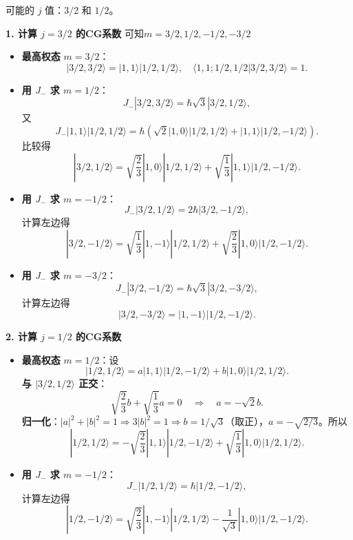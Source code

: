 可能的 \(j\) 值：\(3/2\) 和 \(1/2\)。

\noindent\textbf{1. 计算 \(j = 3/2\) 的CG系数} 可知\(m=3/2,1/2,-1/2,-3/2\)
\begin{itemize}
	\item \textbf{最高权态} \(m = 3/2\)：
	\[
	|3/2, 3/2\rangle = |1, 1\rangle |1/2, 1/2\rangle, \quad \langle 1,1; 1/2,1/2 | 3/2,3/2\rangle = 1.
	\]
	
	\item \textbf{用 \(J_-\) 求 \(m = 1/2\)}：
	\[
	J_- |3/2,3/2\rangle = \hbar\sqrt{3} |3/2,1/2\rangle,
	\]
	又
	\[
	J_- |1,1\rangle |1/2,1/2\rangle = \hbar\left( \sqrt{2} |1,0\rangle |1/2,1/2\rangle + |1,1\rangle |1/2,-1/2\rangle \right).
	\]
	比较得
	\[
	|3/2,1/2\rangle = \sqrt{\frac{2}{3}} |1,0\rangle |1/2,1/2\rangle + \sqrt{\frac{1}{3}} |1,1\rangle |1/2,-1/2\rangle.
	\]
	\item \textbf{用 \(J_-\) 求 \(m = -1/2\)}：
	\[
	J_- |3/2,1/2\rangle = 2\hbar |3/2,-1/2\rangle,
	\]
	计算左边得
	\[
	|3/2,-1/2\rangle = \sqrt{\frac{1}{3}} |1,-1\rangle |1/2,1/2\rangle + \sqrt{\frac{2}{3}} |1,0\rangle |1/2,-1/2\rangle.
	\]
	\item \textbf{用 \(J_-\) 求 \(m = -3/2\)}：
	\[
	J_- |3/2,-1/2\rangle = \hbar\sqrt{3} |3/2,-3/2\rangle,
	\]
	计算左边得
	\[
	|3/2,-3/2\rangle = |1,-1\rangle |1/2,-1/2\rangle.
	\]
\end{itemize}

\vspace{0.5em}
\noindent\textbf{2. 计算 \(j = 1/2\) 的CG系数}
\begin{itemize}
	\item \textbf{最高权态} \(m = 1/2\)：设
	\[
	|1/2,1/2\rangle = a |1,1\rangle |1/2,-1/2\rangle + b |1,0\rangle |1/2,1/2\rangle.
	\]
	\textbf{与 \(|3/2,1/2\rangle\) 正交}：
	\[
	\sqrt{\frac{2}{3}} b + \sqrt{\frac{1}{3}} a = 0 \quad \Rightarrow \quad a = -\sqrt{2} b.
	\]
	\textbf{归一化}：\(|a|^2 + |b|^2 = 1 \Rightarrow 3|b|^2 = 1 \Rightarrow b = 1/\sqrt{3}\)（取正），\(a = -\sqrt{2/3}\)。所以
	\[
	|1/2,1/2\rangle = -\sqrt{\frac{2}{3}} |1,1\rangle |1/2,-1/2\rangle + \sqrt{\frac{1}{3}} |1,0\rangle |1/2,1/2\rangle.
	\]
	\item \textbf{用 \(J_-\) 求 \(m = -1/2\)}：
	\[
	J_- |1/2,1/2\rangle = \hbar |1/2,-1/2\rangle,
	\]
	计算左边得
	\[
	|1/2,-1/2\rangle = \sqrt{\frac{2}{3}} |1,-1\rangle |1/2,1/2\rangle - \frac{1}{\sqrt{3}} |1,0\rangle |1/2,-1/2\rangle.
	\]
	\end{itemize}